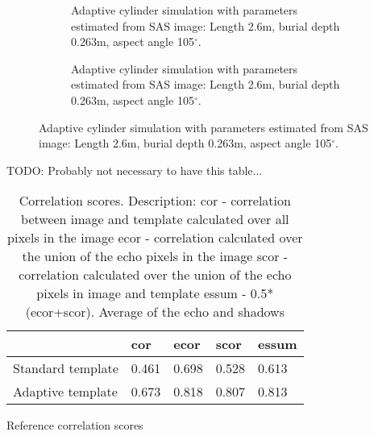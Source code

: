 \documentclass[
   UAM                                          %
 , 12pt                                         %
 , bibtex                                       %
 , layout
]{common/mytemplate}
\begin{document}
\begin{figure}[tp]\centering%
\begin{subfigure}[b]{.5\linewidth-\imgspacing/2}
%
\caption{Adaptive cylinder simulation with parameters estimated from SAS image: Length 2.6\;m, burial depth 0.263\;m, aspect angle 105$^\circ$.}\label{sim_cylinder}%
\end{subfigure}\hspace{\imgspacing}%
\begin{subfigure}[b]{.5\linewidth-\imgspacing/2}
%
\caption{Adaptive cylinder simulation with parameters estimated from SAS image: Length 2.6\;m, burial depth 0.263\;m, aspect angle 105$^\circ$.}\label{sim_cylinder_bw}%
\end{subfigure} 
\end{figure}



\begin{table}[bh]
TODO: Probably not necessary to have this table...\\
\begin{tabular}[c]{l l l l l}\hline
\rowcolor{tabBlue} & cor   & ecor  & scor  & essum \\\hline
Standard template & 0.461 & 0.698 & 0.528 & 0.613 \\
Adaptive template & 0.673 & 0.818 & 0.807 & 0.813
\end{tabular}
\caption{Correlation scores. Description:\newline
cor - correlation between image and template calculated over all pixels in the image\newline
ecor - correlation calculated over the union of the echo pixels in the image\newline
scor - correlation calculated over the union of the echo pixels in image and template\newline
essum - 0.5*(ecor+scor). Average of the echo and shadows}
\end{table}

Reference correlation scores~\cite{Midelfart2010}

% 

% 
\newpage

% 
% 
\end{document}
